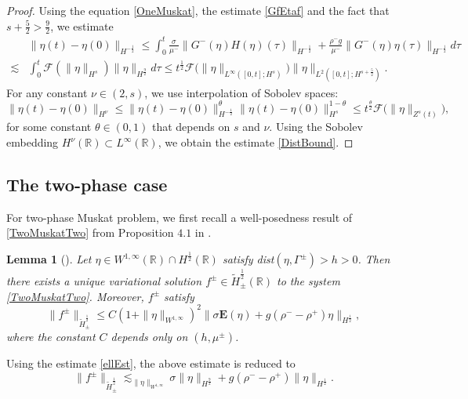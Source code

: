\documentclass[12pt]{amsart}
\newtheorem{lemma}[theorem]{Lemma}
\theoremstyle{definition}
\numberwithin{equation}{section}
\newcommand{\R}{\mathbb{R}}
\newcommand{\f}{\frac}
\begin{document}
\begin{proof}
Using the equation \eqref{OneMuskat}, the estimate \eqref{GfEtaf} and the fact that $s+\f52>\f{9}{2}$, we estimate
 \begin{align*}
 &\|\eta(t) - \eta(0)\|_{H^{-\f12}}\leq \int_0^t \frac{\sigma}{\mu^{-}} \|G^{-}(\eta)H(\eta)(\tau)\|_{H^{-\f12}} + \frac{\rho^{-}g}{\mu^{-}} \|G^{-}(\eta)\eta(\tau)\|_{H^{-\f12}} d\tau \\
 \lesssim&  \int_0^t \mathcal{F}(\|\eta\|_{H^s}) \| \eta\|_{H^\f92}d\tau \leq t^\f12 \mathcal{F}\big(\|\eta\|_{L^\infty([0,t];H^s)}\big)\|\eta\|_{L^2([0,t];H^{s+\f52})}.
 \end{align*}
 For any constant $\nu \in (2, s)$, we use interpolation of Sobolev spaces:
\begin{equation*}
 \|\eta(t) - \eta(0)\|_{H^\nu} \leq \|\eta(t) - \eta(0)\|_{H^{-\f12}}^\theta \|\eta(t) - \eta(0)\|_{H^{s}}^{1-\theta} \leq t^{\frac{\theta}{2}} \mathcal{F}\big(\|\eta\|_{Z^s(t)}\big),
\end{equation*}
for some constant $\theta \in (0,1)$ that depends on $s$ and $\nu$.
Using the Sobolev embedding $H^\nu(\R) \subset L^\infty(\R)$, we obtain the estimate \eqref{DistBound}.
\end{proof}

\subsection{The two-phase case}
For two-phase Muskat problem, we first recall a well-posedness result of \eqref{TwoMuskatTwo} from Proposition $4.1$ in \cite{MR2812947}.
\begin{lemma} [\hspace{1sp}\cite{MR2812947}] \label{t:fpmHHalfEst}
Let $\eta \in W^{1,\infty}(\R)\cap H^\f12(\R)$ satisfy dist$(\eta, \Gamma^\pm) >h>0$.
Then there exists a unique variational solution $f^\pm \in \tilde{H}^\f12_\pm (\R)$ to the system \eqref{TwoMuskatTwo}.
Moreover, $f^\pm$ satisfy
\begin{equation*} 
 \|f^\pm\|_{\tilde{H}^\f12_\pm} \leq C(1+\|\eta\|_{W^{1,\infty}})^2 \| \sigma \mathbf{E}(\eta) + g(\rho^- - \rho^+)\eta\|_{H^\f12},
\end{equation*}
where the constant $C$ depends only on $(h, \mu^\pm)$.
\end{lemma}
Using the estimate \eqref{ellEst}, the above estimate is reduced to
\begin{equation} \label{fpmEst}
 \|f^\pm\|_{\tilde{H}^\f12_\pm} \lesssim_{\|\eta\|_{W^{1,\infty}}}  \sigma \|\eta\|_{H^{\f92}} + g(\rho^- - \rho^+)\|\eta\|_{H^\f12}.
\end{equation}
\end{document}
